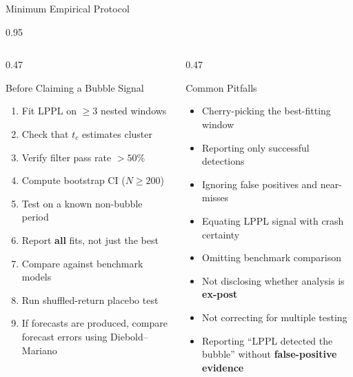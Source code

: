 \documentclass[9pt, aspectratio=169, t]{beamer}
\begin{document}
\begin{frame}{Minimum Empirical Protocol}
    \begin{cminipage}{0.95\textwidth}
    {\scriptsize
    \begin{columns}[T]
        \begin{column}{0.47\textwidth}
            \begin{exampleblock}{Before Claiming a Bubble Signal}
                \begin{enumerate}\setlength{\itemsep}{1pt}
                    \item Fit LPPL on $\geq 3$ nested windows
                    \item Check that $t_c$ estimates cluster
                    \item Verify filter pass rate $> 50\%$
                    \item Compute bootstrap CI ($N \geq 200$)
                    \item Test on a known non-bubble period
                    \item Report \textbf{all} fits, not just the best
                    \item Compare against benchmark models
                    \item Run shuffled-return placebo test
                    \item If forecasts are produced, compare forecast errors using Diebold--Mariano
                \end{enumerate}
            \end{exampleblock}
        \end{column}
        \begin{column}{0.47\textwidth}
            \begin{alertblock}{Common Pitfalls}
                \begin{itemize}\setlength{\itemsep}{1pt}
                    \item Cherry-picking the best-fitting window
                    \item Reporting only successful detections
                    \item Ignoring false positives and near-misses
                    \item Equating LPPL signal with crash certainty
                    \item Omitting benchmark comparison
                    \item Not disclosing whether analysis is \textbf{ex-post}
                    \item Not correcting for multiple testing
                    \item Reporting ``LPPL detected the bubble'' without \textbf{false-positive evidence}
                \end{itemize}
            \end{alertblock}
        \end{column}
    \end{columns}
    }
    \end{cminipage}
\end{frame}
\end{document}
